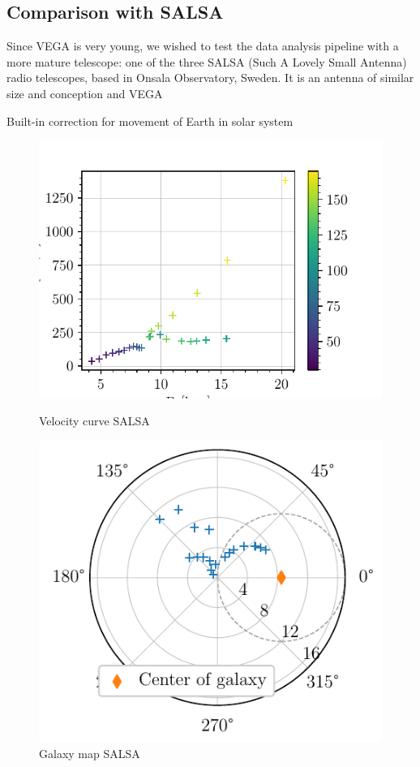 \subsection{Comparison with SALSA}
Since VEGA is very young, we wished to test the data analysis pipeline with a more mature telescope: one of the three SALSA (Such A Lovely Small Antenna) radio telescopes, based in Onsala Observatory, Sweden.
It is an antenna of similar size and conception and VEGA

Built-in correction for movement of Earth in solar system
\begin{figure}[htbp]
    \begin{minipage}[t]{0.5\textwidth}
        \centering
        \captionsetup{width=.9\textwidth}
        \includegraphics[scale=1]{figures/SALSA_velocity_curve.pdf}
        \caption{Velocity curve SALSA}
        \label{fig:SALSA_velocity_curve}
    \end{minipage}
    \begin{minipage}[t]{0.5\textwidth}
        \centering
        \captionsetup{width=.9\textwidth}
        \includegraphics[scale=1]{figures/SALSA_galaxy_map.pdf}
        \caption{Galaxy map SALSA}
        \label{fig:SALSA_galaxy_map}
    \end{minipage}
\end{figure}